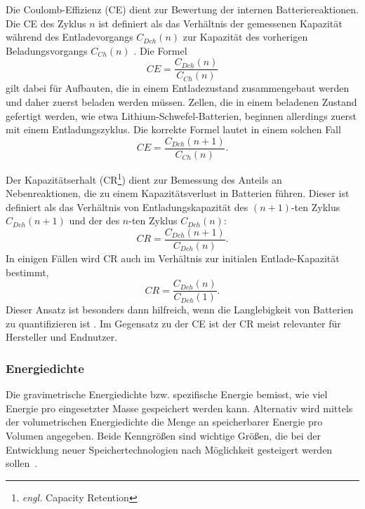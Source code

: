 Die Coulomb-Effizienz (CE) dient zur Bewertung der internen Batteriereaktionen. Die CE des Zyklus \( n \) ist definiert als das Verhältnis der gemessenen Kapazität während des Entladevorgangs \( C_{Dch}(n) \) zur Kapazität des vorherigen Beladungsvorgangs \( C_{Ch}(n) \) \cite{Tornheim2020}.
Die Formel
\begin{equation}
CE = \frac{C_{Dch}(n)}{C_{Ch}(n)}
\end{equation}
gilt dabei für Aufbauten, die in einem Entladezustand zusammengebaut werden und daher zuerst beladen werden müssen. Zellen, die in einem beladenen Zustand gefertigt werden, wie etwa Lithium-Schwefel-Batterien, beginnen allerdings zuerst mit einem Entladungszyklus. Die korrekte Formel lautet in einem solchen Fall
\begin{equation}
    CE = \frac{C_{Dch}(n+1)}{C_{Ch}(n)}.
\end{equation}

Der Kapazitätserhalt (CR\footnote{\textit{engl.} Capacity Retention}) dient zur Bemessung des Anteils an Nebenreaktionen, die zu einem Kapazitätsverlust in Batterien führen. Dieser ist definiert als das Verhältnis von Entladungskapazität des $(n+1)$-ten Zyklus $C_{Dch}(n+1)$ und der des $n$-ten Zyklus $C_{Dch}(n)$:
\begin{equation}
    CR = \frac{C_{Dch}(n+1)}{C_{Dch}(n)}.
\end{equation}
In einigen Fällen wird CR auch im Verhältnis zur initialen Entlade-Kapazität bestimmt,
\begin{equation}
    CR = \frac{C_{Dch}(n)}{C_{Dch}(1)}.
\end{equation}
Dieser Ansatz ist besonders dann hilfreich, wenn die Langlebigkeit von Batterien zu quantifizieren ist \cite{Tornheim2020}.
Im Gegensatz zu der CE ist der CR meist relevanter für Hersteller und Endnutzer.

\subsubsection*{Energiedichte}
Die gravimetrische Energiedichte bzw. spezifische Energie bemisst, wie viel Energie pro eingesetzter Masse gespeichert werden kann. Alternativ wird mittels der volumetrischen Energiedichte die Menge an speicherbarer Energie pro Volumen angegeben. Beide Kenngrößen sind wichtige Größen, die bei der Entwicklung neuer Speichertechnologien nach Möglichkeit gesteigert werden sollen~\cite{Plett2015}.

